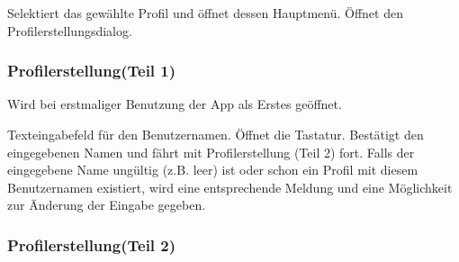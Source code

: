 \begin{requirements}
 Selektiert das gewählte Profil und öffnet dessen Hauptmenü.
 Öffnet den Profilerstellungsdialog.
\end{requirements}

\subsubsection{Profilerstellung(Teil 1)}

\begin{center}
\setlength\fboxsep{20pt}
\setlength\fboxrule{1pt}
\end{center}

Wird bei erstmaliger Benutzung der App als Erstes geöffnet.
\begin{requirements}
 Texteingabefeld für den Benutzernamen. Öffnet die Tastatur.
 Bestätigt den eingegebenen Namen und fährt mit Profilerstellung (Teil 2) fort. Falls der eingegebene Name ungültig (z.B. leer) ist oder schon ein Profil mit diesem Benutzernamen existiert, wird eine entsprechende Meldung und eine Möglichkeit zur Änderung der Eingabe gegeben.
\end{requirements}

\subsubsection{Profilerstellung(Teil 2)}

